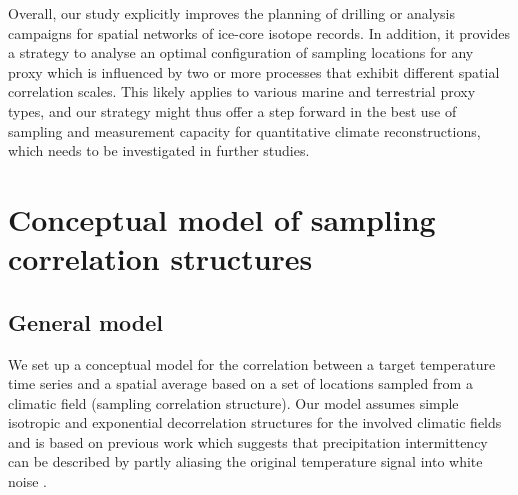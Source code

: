 \documentclass[cp]{copernicus}
\begin{document}
Overall, our study explicitly improves the planning of drilling or analysis
campaigns for spatial networks of ice-core isotope records. In addition, it
provides a strategy to analyse an optimal configuration of sampling locations
for any proxy which is influenced by two or more processes that exhibit
different spatial correlation scales. This likely applies to various marine and
terrestrial proxy types, and our strategy might thus offer a step forward in the
best use of sampling and measurement capacity for quantitative climate
reconstructions, which needs to be investigated in further studies.

\hack{\clearpage}

\appendix

\section{Conceptual model of sampling correlation structures}
\label{app:concept.model}

\subsection{General model}
\label{app:concept.model.general}

We set up a conceptual model for the correlation between a target temperature
time series and a spatial average based on a set of locations sampled from a
climatic field (sampling correlation structure). Our model assumes simple
isotropic and exponential decorrelation structures for the involved climatic
fields and is based on previous work which suggests that precipitation
intermittency can be described by partly aliasing the original temperature
signal into white noise \citep{Laepple2018}.
\end{document}
